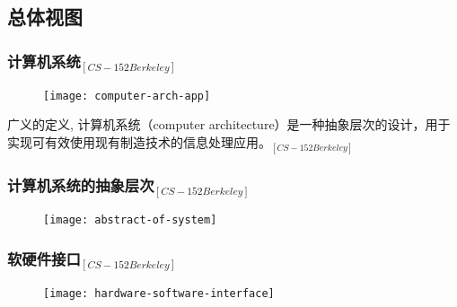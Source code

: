 

\subsection{总体视图} 

\begin{frame}
    
    \frametitle{{计算机系统$_{[CS-152 Berkeley]}$}}
    
    \begin{figure}
        \centering
        \texttt{[image: computer-arch-app]}
    \end{figure}
    \pause
    
    广义的定义, 计算机系统（computer architecture）是一种抽象层次的设计，用于实现可有效使用现有制造技术的信息处理应用。$_{[CS-152 Berkeley]}$
\end{frame}


\begin{frame}
    
    \frametitle{{计算机系统的抽象层次$ _{[CS-152 Berkeley]} $}}
    
    \begin{figure}
        \centering
        \texttt{[image: abstract-of-system]}
    \end{figure}
    
\end{frame}



\begin{frame}[plain]
    
    \frametitle{{软硬件接口$ _{[CS-152 Berkeley]} $}}
    \begin{figure}
        \centering
        \texttt{[image: hardware-software-interface]}
    \end{figure}
    
    
\end{frame}



